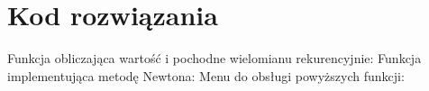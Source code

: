 \documentclass[10pt]{article}   %
\begin{document}
\section{Kod rozwiązania} 
Funkcja obliczająca wartość i pochodne wielomianu rekurencyjnie:\newline
\newpage
Funkcja implementująca metodę Newtona:\newline 
\newpage
Menu do obsługi powyższych funkcji: \newline

\end{document}
